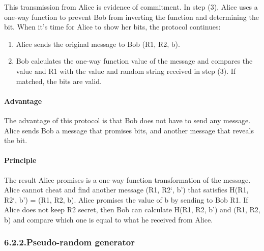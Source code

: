 \documentclass{article}
\begin{document}
\noindent{}This transmission from Alice is evidence of commitment. In step (3), Alice uses a one-way function to prevent Bob from inverting the function and determining the bit. When it's time for Alice to show her bits, the protocol continues:%

\begin{enumerate}[noitemsep,topsep=\mdcompacttopsep,start=4]%

\item{}Alice sends the original message to Bob (R1, R2, b).%

\item{}Bob calculates the one-way function value of the message and compares the value and R1 with the value and random string received in step (3). If matched, the bits are valid.%
\end{enumerate}%

\paragraph{Advantage}\label{sec-advantage}%

\noindent{}The advantage of this protocol is that Bob does not have to send any message. Alice sends Bob a message that promises bits, and another message that reveals the bit.%

\paragraph{Principle}\label{sec-principle}%

\noindent{}The result Alice promises is a one-way function transformation of the message. Alice cannot cheat and find another message (R1, R2\textquoteleft{}, b\textquoteright{}) that satisfies H(R1, R2\textquoteleft{}, b\textquoteright{}) = (R1, R2, b). Alice promises the value of b by sending to Bob R1. If Alice does not keep R2 secret, then Bob can calculate H(R1, R2, b’) and (R1, R2, b) and compare which one is equal to what he received from Alice.%

\subsubsection{6.2.2.\hspace*{0.5em}Pseudo-random generator}\label{sec-pseudo-random-generator}%
\end{document}
